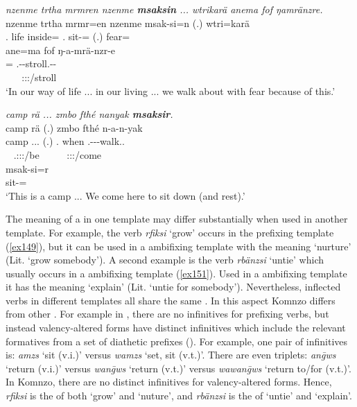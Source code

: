 \begin{exe}
	\ex \emph{nzenme trtha mrmren nzenme \textbf{msaksin} ... wtrikarä anema fof ŋamränzre.}\\
	\gll nzenme trtha mrmr=en nzenme msak-si=n (.) wtri=karä\\
	\Fnsg.\Poss{} life inside=\Loc{} \Fnsg.\Poss{} sit-\Nmlz=\Loc{} (.) fear=\Prop{}\\
	\sn
	\glll ane=ma fof ŋ-a-mrä-nzr-e\\
	\Dem=\Char{} \Emph{} \M.\Alph-\Vc-stroll.\Ext-\Ndu-\Fnsg{}\\
	~ ~ {\Fpl:\Sbj:\Nonpast:\Ipfv/stroll}\\
	\trans `In our way of life ... in our living ... we walk about with fear because of this.' 
	\label{ex324}
\end{exe}
\begin{exe}
	\ex \emph{camp rä ... zmbo fthé nanyak \textbf{msaksir}.}\\
	\glll camp rä (.) zmbo fthé n-a-n-yak\\
	camp \Tsg.\F.\Cop.\Ndu{} (.) \Prox.\All{} when \Fnsg.\Alph-\Vc-\Venit-walk.\Ext.\Ndu{}\\
	~ {\Tsg.\F:\Sbj:\Nonpast:\Ipfv/be} ~ ~ ~ {\Fpl:\Sbj:\Nonpast:\Ipfv/come}\\
	\sn
	\gll msak-si=r\\
	sit-\Nmlz=\Purp{}\\
	\trans `This is a camp ... We come here to sit down (and rest).'\\ 
	\label{ex325}
\end{exe}

The meaning of a  in one template may differ substantially when used in another template. For example, the verb \emph{rfiksi} `grow' occurs in the prefixing template (\ref{ex149}), but it can be used in a  ambifixing template with the meaning `nurture' (Lit. `grow somebody'). A second example is the verb \emph{rbänzsi} `untie' which usually occurs in a  ambifixing template (\ref{ex151}). Used in a  ambifixing template it has the meaning `explain' (Lit. `untie for somebody'). Nevertheless, inflected verbs in different templates all share the same . In this aspect Komnzo differs from other . For example in , there are no infinitives for prefixing verbs, but instead valency-altered forms have distinct infinitives which include the relevant formatives from a set of diathetic prefixes (\citealt{Evans:2015wy}). For example, one pair of infinitives is: \emph{amzs} `sit (v.i.)' versus \emph{wamzs} `set, sit (v.t.)'. There are even triplets: \emph{an\={g}ws} `return (v.i.)' versus \emph{wan\={g}ws} `return (v.t.)' versus \emph{wawan\={g}ws} `return to/for (v.t.)'. In Komnzo, there are no distinct infinitives for valency-altered forms. Hence, \emph{rfiksi} is the  of both `grow' and `nuture', and \emph{rbänzsi} is the  of `untie' and `explain'.%

